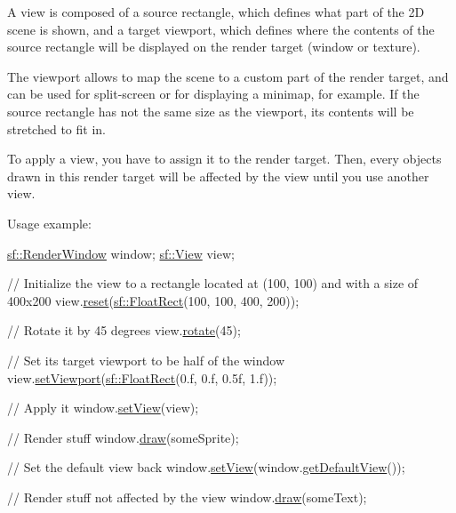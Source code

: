 A view is composed of a source rectangle, which defines what part of the 2\-D scene is shown, and a target viewport, which defines where the contents of the source rectangle will be displayed on the render target (window or texture).

The viewport allows to map the scene to a custom part of the render target, and can be used for split-\/screen or for displaying a minimap, for example. If the source rectangle has not the same size as the viewport, its contents will be stretched to fit in.

To apply a view, you have to assign it to the render target. Then, every objects drawn in this render target will be affected by the view until you use another view.

Usage example\-: 
\begin{DoxyCode}
\hyperlink{classsf_1_1_render_window}{sf::RenderWindow} window;
\hyperlink{classsf_1_1_view}{sf::View} view;

\textcolor{comment}{// Initialize the view to a rectangle located at (100, 100) and with a size of 400x200}
view.\hyperlink{classsf_1_1_view_ac95b636eafab3922b7e8304fb6c00d7d}{reset}(\hyperlink{classsf_1_1_rect}{sf::FloatRect}(100, 100, 400, 200));

\textcolor{comment}{// Rotate it by 45 degrees}
view.\hyperlink{classsf_1_1_view_a5fd3901aae1845586ca40add94faa378}{rotate}(45);

\textcolor{comment}{// Set its target viewport to be half of the window}
view.\hyperlink{classsf_1_1_view_a8eaec46b7d332fe834f016d0187d4b4a}{setViewport}(\hyperlink{classsf_1_1_rect}{sf::FloatRect}(0.f, 0.f, 0.5f, 1.f));

\textcolor{comment}{// Apply it}
window.\hyperlink{classsf_1_1_render_target_a063db6dd0a14913504af30e50cb6d946}{setView}(view);

\textcolor{comment}{// Render stuff}
window.\hyperlink{classsf_1_1_render_target_a12417a3bcc245c41d957b29583556f39}{draw}(someSprite);

\textcolor{comment}{// Set the default view back}
window.\hyperlink{classsf_1_1_render_target_a063db6dd0a14913504af30e50cb6d946}{setView}(window.\hyperlink{classsf_1_1_render_target_a718b1aa6296bf855171699cc18251ced}{getDefaultView}());

\textcolor{comment}{// Render stuff not affected by the view}
window.\hyperlink{classsf_1_1_render_target_a12417a3bcc245c41d957b29583556f39}{draw}(someText);
\end{DoxyCode}


